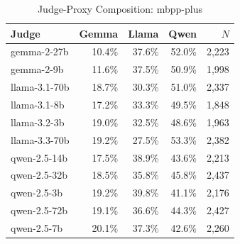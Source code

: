 \begin{table}[htbp]
\centering
\caption{Judge-Proxy Composition: mbpp-plus}
\label{tab:composition_mbpp-plus}
\begin{tabular}{lrrrr}
\toprule
Judge & Gemma & Llama & Qwen & $N$ \\
\midrule
gemma-2-27b & 10.4\% & 37.6\% & 52.0\% & 2,223 \\
gemma-2-9b & 11.6\% & 37.5\% & 50.9\% & 1,998 \\
llama-3.1-70b & 18.7\% & 30.3\% & 51.0\% & 2,337 \\
llama-3.1-8b & 17.2\% & 33.3\% & 49.5\% & 1,848 \\
llama-3.2-3b & 19.0\% & 32.5\% & 48.6\% & 1,963 \\
llama-3.3-70b & 19.2\% & 27.5\% & 53.3\% & 2,382 \\
qwen-2.5-14b & 17.5\% & 38.9\% & 43.6\% & 2,213 \\
qwen-2.5-32b & 18.5\% & 35.8\% & 45.8\% & 2,437 \\
qwen-2.5-3b & 19.2\% & 39.8\% & 41.1\% & 2,176 \\
qwen-2.5-72b & 19.1\% & 36.6\% & 44.3\% & 2,427 \\
qwen-2.5-7b & 20.1\% & 37.3\% & 42.6\% & 2,260 \\
\bottomrule
\end{tabular}
\end{table}